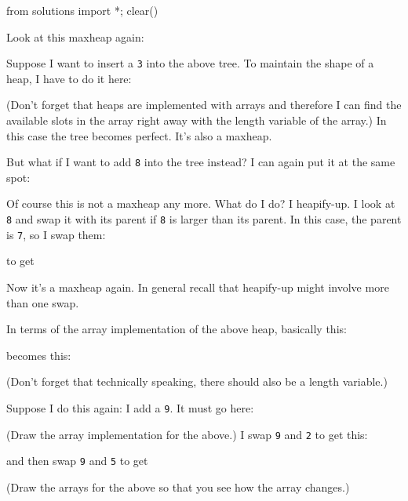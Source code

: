 \begin{python0}
from solutions import *; clear()
\end{python0}

Look at this maxheap again:



Suppose I want to insert a \verb!3! into the above tree.
To maintain the shape of a heap, I have to do it here:



(Don't forget that heaps are implemented with arrays
and therefore I can find the available slots in the array
right away with the length variable of the array.)
In this case the tree becomes perfect.
It's also a maxheap.

But what if I want to add \verb!8! into the tree instead?
I can again put it at the same spot:



Of course this is not a maxheap any more.
What do I do?
I heapify-up.
I look at \verb!8!
and swap it with its parent if \verb!8! is larger than
its parent.
In this case, the parent is \verb!7!, so I swap them:



to get



Now it's a maxheap again.
In general recall that heapify-up might involve
more than one swap.

In terms of the array implementation of the above heap, basically
this:



becomes this:



(Don't forget that technically speaking, there should also be a
length variable.)

Suppose I do this again: I add a \verb!9!.
It must go here:



(Draw the array implementation for the above.)
I swap \verb!9! and \verb!2! to get this:



and then swap \verb!9! and \verb!5! to get



(Draw the arrays for the above so that you see how the array changes.)

